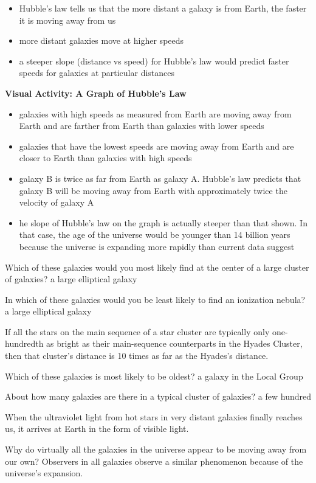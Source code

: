\begin{itemize}
\item Hubble’s law tells us that the more distant a galaxy is from Earth, the faster it is moving away from us
\item more distant galaxies move at higher speeds
\item a steeper slope (distance vs speed) for Hubble’s law would predict faster speeds for galaxies at particular distances
\end{itemize}
\textbf{Visual Activity: A Graph of Hubble’s Law}
\begin{itemize}
\item galaxies with high speeds as measured from Earth are moving away from Earth and are farther from Earth than galaxies with lower speeds
\item galaxies that have the lowest speeds are moving away from Earth and are closer to Earth than galaxies with high speeds
\item galaxy B is twice as far from Earth as galaxy A. Hubble’s law predicts that galaxy B will be moving away from Earth with approximately twice the velocity of galaxy A
\item he slope of Hubble’s law on the graph is actually steeper than that shown. In that case, the age of the universe would be younger than 14 billion years because the universe is expanding more rapidly than current data suggest
\end{itemize}

Which of these galaxies would you most likely find at the center of a large cluster of galaxies? a large elliptical galaxy

In which of these galaxies would you be least likely to find an ionization nebula? a large elliptical galaxy

If all the stars on the main sequence of a star cluster are typically only one-hundredth as bright as their main-sequence counterparts in the Hyades Cluster, then that cluster's distance is 10 times as far as the Hyades's distance.

Which of these galaxies is most likely to be oldest? a galaxy in the Local Group

About how many galaxies are there in a typical cluster of galaxies?  a few hundred

When the ultraviolet light from hot stars in very distant galaxies finally reaches us, it arrives at Earth in the form of visible light.

Why do virtually all the galaxies in the universe appear to be moving away from our own? Observers in all galaxies observe a similar phenomenon because of the universe's expansion.

